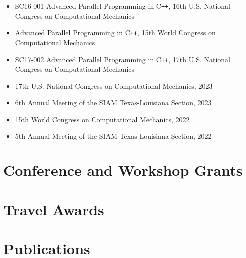 \documentclass[11pt,a4paper,sans]{moderncv}
\begin{document}
\begin{itemize}[leftmargin=4cm]
\item SC16-001 Advanced Parallel Programming in C\texttt{++}, 16th U.S. National Congress on Computational Mechanics
\item Advanced Parallel Programming in C\texttt{++}, 15th World Congress on Computational Mechanics
\item SC17-002 Advanced Parallel Programming in C\texttt{++}, 17th U.S. National Congress on Computational Mechanics
\end{itemize}

\begin{itemize}[leftmargin=4cm]
\item 17th U.S. National Congress on Computational Mechanics, 2023
\item 6th Annual Meeting of the SIAM Texas-Louisiana Section, 2023
\item 15th World Congress on Computational Mechanics, 2022
\item 5th Annual Meeting of the SIAM Texas-Louisiana Section, 2022
\end{itemize}

\section{Conference and Workshop Grants}

\section{Travel Awards}

\section{Publications}
%
\end{document}
